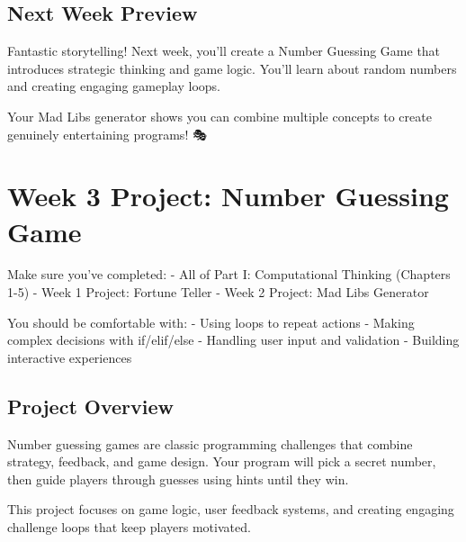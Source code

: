\documentclass[
  letterpaper,
  DIV=11,
  numbers=noendperiod,
  oneside]{scrreprt}
\begin{document}
\section{Next Week Preview}\label{next-week-preview-1}

Fantastic storytelling! Next week, you'll create a Number Guessing Game
that introduces strategic thinking and game logic. You'll learn about
random numbers and creating engaging gameplay loops.

Your Mad Libs generator shows you can combine multiple concepts to
create genuinely entertaining programs! 🎭

\chapter{Week 3 Project: Number Guessing
Game}\label{sec-project-number-game}

\begin{tcolorbox}[enhanced jigsaw, opacityback=0, colback=white, colframe=quarto-callout-important-color-frame, breakable, titlerule=0mm, coltitle=black, rightrule=.15mm, colbacktitle=quarto-callout-important-color!10!white, left=2mm, bottomtitle=1mm, bottomrule=.15mm, title=\textcolor{quarto-callout-important-color}{\faExclamation}\hspace{0.5em}{Before You Start}, opacitybacktitle=0.6, toptitle=1mm, leftrule=.75mm, arc=.35mm, toprule=.15mm]

Make sure you've completed: - All of Part I: Computational Thinking
(Chapters 1-5) - Week 1 Project: Fortune Teller - Week 2 Project: Mad
Libs Generator

You should be comfortable with: - Using loops to repeat actions - Making
complex decisions with if/elif/else - Handling user input and validation
- Building interactive experiences

\end{tcolorbox}

\section{Project Overview}\label{project-overview-2}

Number guessing games are classic programming challenges that combine
strategy, feedback, and game design. Your program will pick a secret
number, then guide players through guesses using hints until they win.

This project focuses on game logic, user feedback systems, and creating
engaging challenge loops that keep players motivated.
\end{document}
